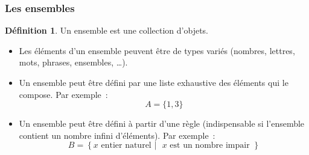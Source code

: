 \documentclass[10pt,notheorems]{beamer}
\theoremstyle{plain}
\theoremstyle{definition} %
\newtheorem{definition}{Définition}
\begin{document}
\begin{frame}
  \frametitle{Les ensembles}
  \hypertarget{slide_ensembles_notations_definitions_1}{}

  \begin{definition}
    Un ensemble est une collection d'objets.
  \end{definition}

  \medskip

  \begin{itemize}
  \item Les éléments d'un ensemble peuvent être de types variés (nombres, lettres, mots, phrases, ensembles, \ldots).\newline
  \item Un ensemble peut être défini par une liste exhaustive des éléments qui le compose. Par exemple~:
    \[
      A = \{1,3\}
    \]
  \item Un ensemble peut être défini à partir d'une règle (indispensable si l'ensemble contient un nombre infini d'éléments). Par exemple~:
    \[
      B = \left\{ x \text{ entier naturel } | \text{ } x \text{ est un nombre impair }\right\}
    \]
  \end{itemize}

\end{frame}
\end{document}

